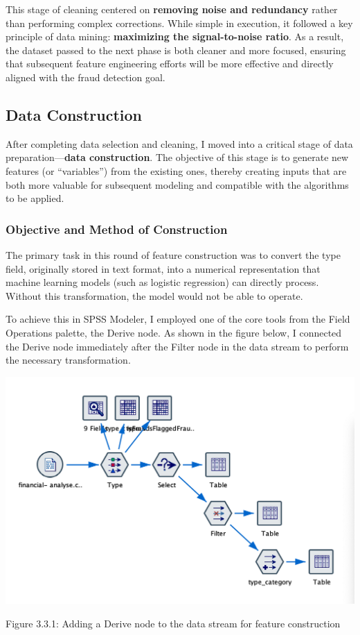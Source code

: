 \documentclass[sigplan,screen]{acmart}
\begin{document}
This stage of cleaning centered on \textbf{removing noise and redundancy} rather than performing complex corrections. While simple in execution, it followed a key principle of data mining: \textbf{maximizing the signal-to-noise ratio}. As a result, the dataset passed to the next phase is both cleaner and more focused, ensuring that subsequent feature engineering efforts will be more effective and directly aligned with the fraud detection goal.

\subsection{Data Construction}
    
After completing data selection and cleaning, I moved into a critical stage of data preparation---\textbf{data construction}. The objective of this stage is to generate new features (or ``variables'') from the existing ones, thereby creating inputs that are both more valuable for subsequent modeling and compatible with the algorithms to be applied.
    
\subsubsection{Objective and Method of Construction}
    
The primary task in this round of feature construction was to convert the type field, originally stored in text format, into a numerical representation that machine learning models (such as logistic regression) can directly process. Without this transformation, the model would not be able to operate.
    
To achieve this in SPSS Modeler, I employed one of the core tools from the Field Operations palette, the Derive node. As shown in the figure below, I connected the Derive node immediately after the Filter node in the data stream to perform the necessary transformation.

\vspace{0.3cm}

\begin{center}
\includegraphics[width=0.9\columnwidth]{3.3.1.png}
\vspace{0.2cm}

Figure 3.3.1: Adding a Derive node to the data stream for feature construction
\end{center}
\end{document}
